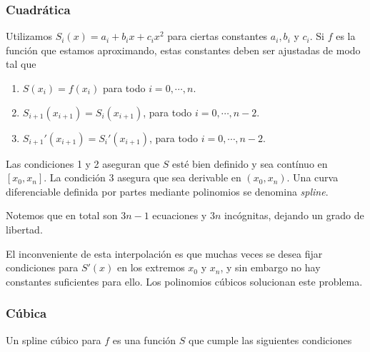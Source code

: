 \subsubsection{Cuadrática}

Utilizamos $S_i(x) = a_i + b_i x + c_i x^2$ para ciertas constantes $a_i, b_i$ y $c_i$. Si $f$ es la función que estamos aproximando, estas constantes deben ser ajustadas de modo tal que

\begin{enumerate}
\item $S(x_i) = f(x_i)$ para todo $i = 0, \cdots, n$.
\item $S_{i + 1}(x_{i + 1}) = S_i(x_{i + 1})$, para todo $i = 0, \cdots, n - 2$.
\item $S_{i + 1}'(x_{i + 1}) = S_i'(x_{i + 1})$, para todo $i = 0, \cdots, n - 2$.
\end{enumerate}

Las condiciones 1 y 2 aseguran que $S$ esté bien definido y sea contínuo en $[x_0, x_n]$. La condición 3 asegura que sea derivable en $(x_0, x_n)$. Una curva diferenciable definida por partes mediante polinomios se denomina \textit{spline}.

Notemos que en total son $3n - 1$ ecuaciones y $3n$ incógnitas, dejando un grado de libertad.

El inconveniente de esta interpolación es que muchas veces se desea fijar condiciones para $S'(x)$ en los extremos $x_0$ y $x_n$, y sin embargo no hay constantes suficientes para ello. Los polinomios cúbicos solucionan este problema.

\subsubsection{Cúbica}
Un spline cúbico para $f$ es una función $S$ que cumple las siguientes condiciones

